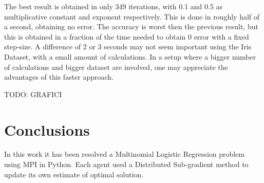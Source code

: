 \documentclass[a4paper,11pt,oneside]{book}
\begin{document}
\noindent The best result is obtained in only 349 iterations, with 0.1 and 0.5 as multiplicative constant and exponent respectively. This is done in roughly half of a second, obtaining no error. The accuracy is worst then the previous result, but this is obtained in a fraction of the time needed to obtain 0 error with a fixed step-size. A difference of 2 or 3 seconds may not seem important using the Iris Dataset, with a small amount of calculations. In a setup where a bigger number of calculations and bigger dataset are involved, one may appreciate the advantages of this faster approach.




TODO: GRAFICI

\chapter*{Conclusions} %
In this work it has been resolved a Multinomial Logistic Regression problem using MPI in Python. Each agent used a Distributed Sub-gradient method to update its own estimate of optimal solution.


{}
   
\end{document}
